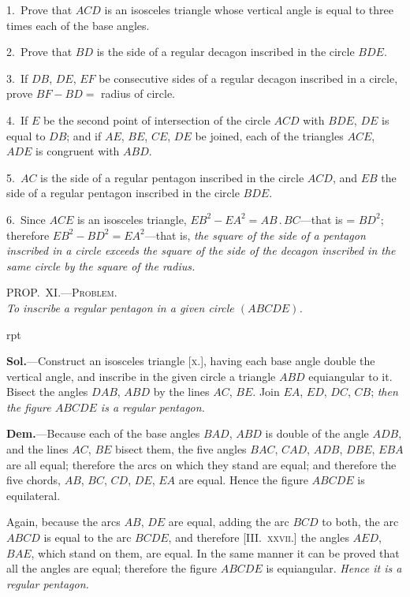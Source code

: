 \documentclass[oneside]{book}
\newcommand\myprop[2]{
\bigskip\Needspace*{4\baselineskip}\begin{center}\textsc{#1}\\\medskip\emph{#2}\par\end{center}
}
\newcommand\imgflow[3]{
\setcounter{wrapwidth}{#1}
\begin{wrapfigure}[#2]{r}{\value{wrapwidth}pt}
\begin{center}
\vspace{-0.3in}
\end{center}
\end{wrapfigure}
}
\begin{document}
\begin{footnotesize}
1.~Prove that $ACD$ is an isosceles triangle whose vertical angle
is equal to three times each of the base angles.

2.~Prove that $BD$ is the side of a regular decagon inscribed in
the circle $BDE$.

3.~If $DB$, $DE$, $EF$ be consecutive sides of a regular decagon
inscribed in a circle, prove $BF - BD =$ radius of circle.

4.~If $E$ be the second point of intersection of the circle $ACD$
with $BDE$, $DE$ is equal to $DB$; and if $AE$, $BE$, $CE$, $DE$ be
joined, each of the triangles $ACE$, $ADE$ is congruent with $ABD$.

5.~$AC$ is the side of a regular pentagon inscribed in the circle
$ACD$, and $EB$ the side of a regular pentagon inscribed in the
circle $BDE$.

6.~Since $ACE$ is an isosceles triangle, $EB^{2} - EA^{2} = AB\,.\,BC$---that
is = $BD^{2}$; therefore $EB^{2} - BD^{2} = EA^{2}$---that is, \textit{the square
of the side of a pentagon inscribed in a circle exceeds the square of
the side of the decagon inscribed in the same circle by the square of
the radius.}
\par\end{footnotesize}

\myprop{PROP\@.~XI\@.---Problem.}{To inscribe a regular pentagon in a given circle $(ABCDE)$.}

\imgflow{130}{11}{f163}

\textbf{Sol.}---Construct an isosceles triangle [\textsc{x.}], having
each base angle double the vertical
angle, and inscribe in the
given circle a triangle $ABD$
equiangular to it. Bisect the
angles $DAB$, $ABD$ by the lines
$AC$, $BE$. Join $EA$, $ED$, $DC$,
$CB$; \emph{then the figure $ABCDE$ is
a regular pentagon.}

\textbf{Dem.}---Because each of the
base angles $BAD$, $ABD$ is
double of the angle $ADB$, and the lines $AC$, $BE$ bisect
them, the five angles $BAC$, $CAD$, $ADB$, $DBE$, $EBA$ are
all equal; therefore the arcs on which they stand are
equal; and therefore the five chords, $AB$, $BC$, $CD$, $DE$,
$EA$ are equal. Hence the figure $ABCDE$ is equilateral.

Again, because the arcs $AB$, $DE$ are equal, adding
the arc $BCD$ to both, the arc $ABCD$ is equal to the arc
$BCDE$, and therefore [III\@.~\textsc{xxvii.}] the angles $AED$,
$BAE$, which stand on them, are equal. In the same
manner it can be proved that all the angles are equal;
therefore the figure $ABCDE$ is equiangular. \emph{Hence it
is a regular pentagon.}
\end{document}
